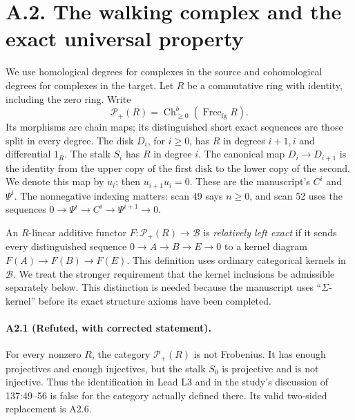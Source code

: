 
\section{A.2. The walking complex and the exact universal property}
\label{sec:A2}

We use homological degrees for complexes in the source and cohomological
degrees for complexes in the target.  Let $R$ be a commutative ring with
identity, including the zero ring.  Write
\[
 \mathcal P_+(R)=\operatorname{Ch}^{b}_{\geq0}
                 (\operatorname{Free}_{\mathrm{fg}}R).
\]
Its morphisms are chain maps; its distinguished short exact sequences are
those split in every degree.  The disk $D_i$, for $i\geq0$, has $R$ in
degrees $i+1,i$ and differential $1_R$.  The stalk $S_i$ has $R$ in degree
$i$.  The canonical map $D_i\to D_{i+1}$ is the identity from the upper
copy of the first disk to the lower copy of the second.  We denote this
map by $u_i$; then $u_{i+1}u_i=0$.  These are the manuscript's $C^i$ and
$\Psi^i$.  The nonnegative indexing matters: scan 49 says $n\geq0$, and
scan 52 uses the sequences $0\to\Psi^i\to C^i\to\Psi^{i+1}\to0$.

An $R$-linear additive functor $F:\mathcal P_+(R)\to\mathcal B$ is
\emph{relatively left exact} if it sends every distinguished sequence
$0\to A\to B\to E\to0$ to a kernel diagram
$F(A)\to F(B)\to F(E)$.  This definition uses ordinary categorical
kernels in $\mathcal B$.  We treat the stronger requirement that the
kernel inclusions be admissible separately below.  This distinction is
needed because the manuscript uses ``$\Sigma$-kernel'' before its exact
structure axioms have been completed.

\paragraph{A2.1 (Refuted, with corrected statement).}
\label{A2.1}
For every nonzero $R$, the category $\mathcal P_+(R)$ is not Frobenius.
It has enough projectives and enough injectives, but the stalk $S_0$ is
projective and is not injective.  Thus the identification in Lead L3 and
in the study's discussion of 137:49--56 is false for the category actually
defined there.  Its valid two-sided replacement is A2.6.

